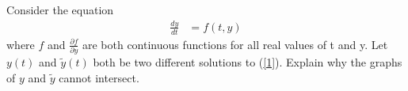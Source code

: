 \documentclass[12pt,letterpaper]{hmcpset}
\begin{document}
\begin{solution}
    \vfill
\end{solution}
\clearpage

\begin{problem}[B8]
    Consider the equation
    \begin{align}
        \frac{dy}{dt} &= f(t,y) \label{1}
    \end{align}
    where $f$ and $\frac{\partial f}{\partial y}$ are both
    continuous functions for all real values of t and y. Let
    $y(t)$ and $\tilde{y}(t)$ both be two different solutions
    to (\ref{1}). Explain why the graphs of $y$ and 
    $\tilde{y}$ cannot intersect.
\end{problem}

\begin{solution}
    \vfill
\end{solution}
\end{document}
